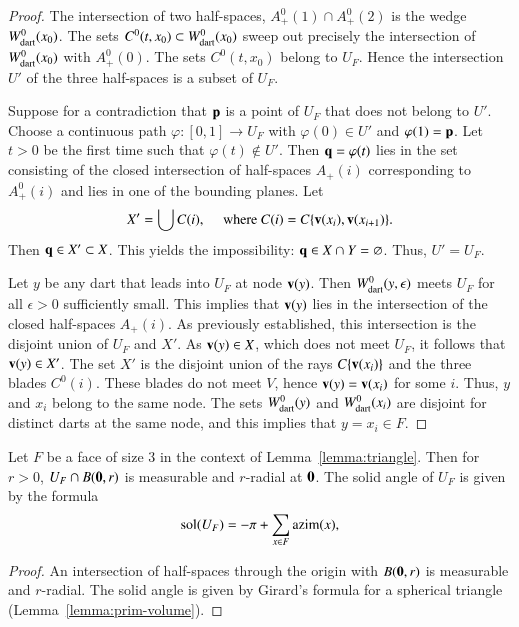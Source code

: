 \begin{proof} The intersection of two half-spaces, $A^0_+(1)\cap A^0_+(2)$ is
the wedge $W^0_{\text{dart}}(x_0)$.   The sets $C^0(t,x_0)\subset W^0_{\text{dart}}(x_0)$ sweep out precisely
the intersection of $W^0_{\text{dart}}(x_0)$ with $A^0_+(0)$.  The sets $C^0(t,x_0)$ belong to
$U_F$.  Hence the intersection $U'$ of the three half-spaces is a subset of $U_F$.

Suppose for a contradiction 
that ${\mathbf p}$ is a point of $U_F$ that does not belong to $U'$.  Choose a continuous path $\varphi:[0,1]\to U_F$ with $\varphi(0)\in U'$ and $\varphi(1)={\mathbf p}$.  Let $t>0$ be the first time such that $\varphi(t)\not\in U'$.  Then ${\mathbf q}=\varphi(t)$ lies in the set consisting of the closed intersection of half-spaces $A_+(i)$ corresponding to $A^0_+(i)$ and lies
in one of the bounding planes.  Let 
$$
X' = \bigcup C(i),\quad\text{ where } C(i)=C\{{\mathbf v}(x_i),{\mathbf v}(x_{i+1})\}.
$$
Then ${\mathbf q}\in X'\subset X$.  This yields the impossibility:
${\mathbf q}\in X\cap Y = \varnothing$.   Thus, $U'=U_F$.

Let $y$ be any dart that leads into $U_F$ at node ${\mathbf v}(y)$.  Then
$W^0_{\text{dart}}(y,\epsilon)$ meets $U_F$ for all $\epsilon>0$ sufficiently small.
This implies that ${\mathbf v}(y)$ lies in the intersection of the closed half-spaces $A_+(i)$.  As previously established, this intersection is the disjoint union of $U_F$ and
$X'$.  As ${\mathbf v}(y)\in X$, which does not meet $U_F$, it follows that ${\mathbf v}(y)\in X'$.
The set $X'$ is the disjoint union of the rays $C\{{\mathbf v}(x_i)\}$ and
the three blades $C^0(i)$.  These blades do not meet $V$, hence
${\mathbf v}(y)={\mathbf v}(x_i)$ for some $i$.  Thus, $y$ and $x_i$ belong to the same
node.  The sets $W^0_{\text{dart}}(y)$ and $W^0_{\text{dart}}( x_i)$ are disjoint for distinct darts at the same
node, and this implies that $y=x_i\in F$.
\end{proof}

\begin{corollary}\label{lemma:girard-component}
Let $F$ be a face of size $3$ in the context of Lemma~\ref{lemma:triangle}.  Then for $r>0$, $U_F \cap B({\mathbf 0},r)$ is measurable and $r$-radial at ${\mathbf 0}$.
The solid angle of $U_F$ is given by the formula
$$
\operatorname{sol}(U_F) = -\pi + \sum_{x\in F}{\operatorname{azim}}(x),
$$
\end{corollary}
%
%
%

\begin{proof} An intersection of half-spaces through the origin 
with $B({\mathbf 0},r)$ is measurable and
$r$-radial.  The solid angle is given by Girard's formula for
a spherical triangle (Lemma~\ref{lemma:prim-volume}).
\end{proof}
%

